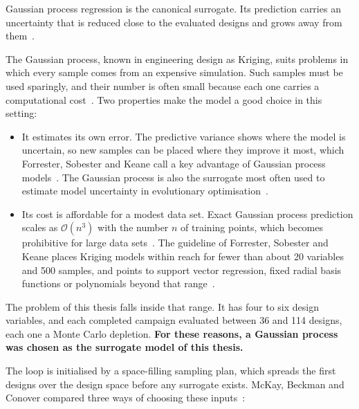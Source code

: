 Gaussian process regression is the canonical surrogate. Its prediction
carries an uncertainty that is reduced close to the evaluated designs
and grows away from them~\cite{rasmussen_gp_2006}.

The Gaussian process, known in engineering design as Kriging, suits
problems in which every sample comes from an expensive simulation. Such
samples must be used sparingly, and their number is often small because
each one carries a computational cost~\cite{forrester_book_2008}. Two
properties make the model a good choice in this setting:

\begin{itemize}
  \item It estimates its own error. The predictive variance shows where
        the model is uncertain, so new samples can be placed where they
        improve it most, which Forrester, Sobester and Keane call a key
        advantage of Gaussian process models~\cite{forrester_book_2008}.
        The Gaussian process is also the surrogate most often used to
        estimate model uncertainty in evolutionary
        optimisation~\cite{jin_2011}.

  \item Its cost is affordable for a modest data set. Exact Gaussian
        process prediction scales as $\mathcal{O}(n^3)$ with the number
        $n$ of training points, which becomes prohibitive for large data
        sets~\cite{rasmussen_gp_2006}. The guideline of Forrester,
        Sobester and Keane places Kriging models within reach for fewer
        than about 20 variables and 500 samples, and points to support
        vector regression, fixed radial basis functions or polynomials
        beyond that range~\cite{forrester_book_2008}.
\end{itemize}

The problem of this thesis falls inside that range. It has four to six
design variables, and each completed campaign evaluated between 36 and
114 designs, each one a Monte Carlo depletion. \textbf{For these reasons, a
Gaussian process was chosen as the surrogate model of this thesis.}

The loop is initialised by a space-filling sampling plan, which spreads
the first designs over the design space before any surrogate exists.
McKay, Beckman and Conover compared three ways of choosing these
inputs~\cite{mckay_lhs_1979}:

